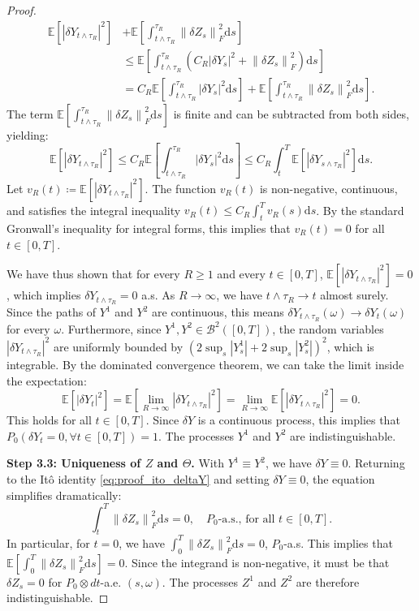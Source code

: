 \documentclass[12pt, letterpaper]{amsart}
\newcommand{\Bcal}{\mathcal{B}}
\newcommand{\dd}{\mathrm{d}}
\newcommand{\norm}[1]{\left\lVert#1\right\rVert}
\newcommand{\abs}[1]{\left\lvert#1\right\rvert}
\theoremstyle{plain}
\theoremstyle{definition}
\theoremstyle{remark}
\numberwithin{equation}{section} %
\begin{document}
\begin{proof}
\begin{align*}
    \mathbb{E}\left[\abs{\delta Y_{t \wedge \tau_R}}^2\right] &+ \mathbb{E}\left[\int_{t \wedge \tau_R}^{\tau_R} \norm{\delta Z_s}_F^2 \dd s\right] \\
    &\le \mathbb{E}\left[\int_{t \wedge \tau_R}^{\tau_R} \left( C_R \abs{\delta Y_s}^2 + \norm{\delta Z_s}_F^2 \right) \dd s\right] \\
    &= C_R \mathbb{E}\left[\int_{t \wedge \tau_R}^{\tau_R} \abs{\delta Y_s}^2 \dd s\right] + \mathbb{E}\left[\int_{t \wedge \tau_R}^{\tau_R} \norm{\delta Z_s}_F^2 \dd s\right].
\end{align*}
The term $\mathbb{E}\left[\int_{t \wedge \tau_R}^{\tau_R} \norm{\delta Z_s}_F^2 \dd s\right]$ is finite and can be subtracted from both sides, yielding:
\[
    \mathbb{E}\left[\abs{\delta Y_{t \wedge \tau_R}}^2\right] \le C_R \mathbb{E}\left[\int_{t \wedge \tau_R}^{\tau_R} \abs{\delta Y_s}^2 \dd s\right] \le C_R \int_t^T \mathbb{E}\left[\abs{\delta Y_{s \wedge \tau_R}}^2\right] \dd s.
\]
Let \(v_R(t) \coloneqq \mathbb{E}\left[\abs{\delta Y_{t \wedge \tau_R}}^2\right]\). The function $v_R(t)$ is non-negative, continuous, and satisfies the integral inequality \(v_R(t) \le C_R \int_t^T v_R(s) \dd s\). By the standard Gronwall's inequality for integral forms, this implies that \(v_R(t) = 0\) for all \(t \in [0,T]\).

We have thus shown that for every \(R \ge 1\) and every $t \in [0,T]$, \(\mathbb{E}\left[\abs{\delta Y_{t \wedge \tau_R}}^2\right] = 0\), which implies $\delta Y_{t \wedge \tau_R} = 0$ a.s. As \(R \to \infty\), we have \(t \wedge \tau_R \to t\) almost surely. Since the paths of $Y^1$ and $Y^2$ are continuous, this means $\delta Y_{t \wedge \tau_R}(\omega) \to \delta Y_t(\omega)$ for every $\omega$. Furthermore, since $Y^1, Y^2 \in \Bcal^2([0,T])$, the random variables $\abs{\delta Y_{t \wedge \tau_R}}^2$ are uniformly bounded by $(2\sup_s|Y^1_s| + 2\sup_s|Y^2_s|)^2$, which is integrable. By the dominated convergence theorem, we can take the limit inside the expectation:
\[
    \mathbb{E}[\abs{\delta Y_t}^2] = \mathbb{E}\left[\lim_{R \to \infty} \abs{\delta Y_{t \wedge \tau_R}}^2\right] = \lim_{R \to \infty} \mathbb{E}\left[\abs{\delta Y_{t \wedge \tau_R}}^2\right] = 0.
\]
This holds for all \(t \in [0,T]\). Since $\delta Y$ is a continuous process, this implies that $P_0(\delta Y_t = 0, \forall t \in [0,T]) = 1$. The processes $Y^1$ and $Y^2$ are indistinguishable.

\vspace{1ex}
\noindent\textbf{Step 3.3: Uniqueness of \(Z\) and \(\Theta\).}
With \(Y^1 \equiv Y^2\), we have \(\delta Y \equiv 0\). Returning to the Itô identity \eqref{eq:proof_ito_deltaY} and setting $\delta Y \equiv 0$, the equation simplifies dramatically:
\[
    \int_t^T \norm{\delta Z_s}_F^2 \dd s = 0, \quad P_0\text{-a.s., for all } t \in [0,T].
\]
In particular, for $t=0$, we have $\int_0^T \norm{\delta Z_s}_F^2 \dd s = 0$, $P_0$-a.s. This implies that \(\mathbb{E}[\int_0^T \norm{\delta Z_s}_F^2 \dd s] = 0\). Since the integrand is non-negative, it must be that \(\delta Z_s = 0\) for $P_0 \otimes dt$-a.e. $(s,\omega)$. The processes $Z^1$ and $Z^2$ are therefore indistinguishable.


\end{proof}
\end{document}
